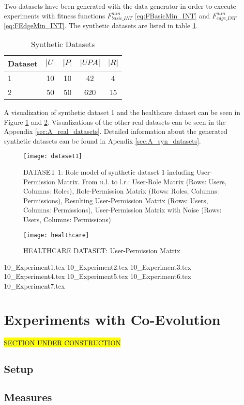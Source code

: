 Two datasets have been generated with the data generator in order to execute experiments with fitness functions $F_{basic\_INT}^{min}$ \eqref{eq:FBasicMin_INT} and $F_{edge\_INT}^{min}$ \eqref{eq:FEdgeMin_INT}. The synthetic datasets are listed in table \ref{tab:syntheticDatasets}.

\begin{table}[H]
    \centering
    \begin{tabular}{|l|c|c|c|c|}
        \hline
        \rowcolor{myGray} 
        \textbf{Dataset} & \textbf{$|U|$} & \textbf{$|P|$} & \textbf{$|UPA|$} & \textbf{$|R|$}\\ \hline
        1       & 10    & 10   & 42    & 4\\ \hline
        2       & 50    & 50   & 620   & 15\\ \hline
    \end{tabular}
    \caption{Synthetic Datasets}
    \label{tab:syntheticDatasets}
\end{table}

A visualization of synthetic dataset 1 and the healthcare dataset can be seen in Figure \ref{fig:dataset1} and \ref{fig:healthcare}. Visualizations of the other real datasets can be seen in the Appendix \ref{sec:A_real_datasets}. Detailed information about the generated synthetic datasets can be found in Apendix \ref{sec:A_syn_datasets}.

\begin{figure}[H]
    \centering
    \texttt{[image: dataset1]}
    \caption{DATASET 1: Role model of synthetic dataset 1 including User-Permission Matrix. From u.l. to l.r.: User-Role Matrix (Rows: Users, Columns: Roles), Role-Permission Matrix (Rows: Roles, Columns: Permissions), Resulting User-Permission Matrix (Rows: Users, Columns: Permissions), User-Permission Matrix with Noise (Rows: Users, Columns: Permissions)}
    \label{fig:dataset1}
\end{figure}

\begin{figure}[H]
    \centering
    \texttt{[image: healthcare]}
    \caption{HEALTHCARE DATASET: User-Permission Matrix}
    \label{fig:healthcare}
\end{figure}

{10_Experiment1.tex}
{10_Experiment2.tex}
{10_Experiment3.tex}
{10_Experiment4.tex}
{10_Experiment5.tex}
{10_Experiment6.tex}
{10_Experiment7.tex}

\section{Experiments with Co-Evolution}
\hl{SECTION UNDER CONSTRUCTION}\\
\subsection{Setup}
\subsection{Measures}
